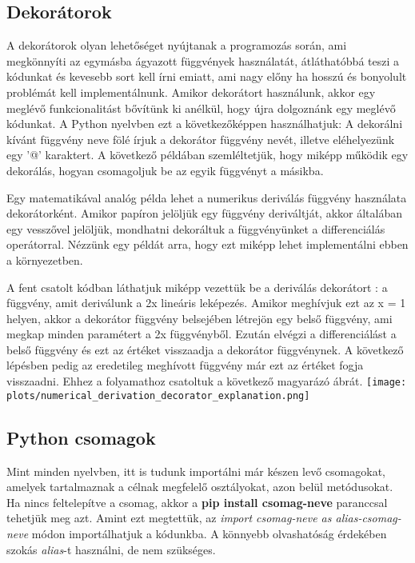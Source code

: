 \documentclass{article}
\theoremstyle{definition}
\theoremstyle{theorem}
\begin{document}
\subsection{Dekorátorok}
A dekorátorok olyan lehetőséget nyújtanak a programozás során, ami megkönnyíti az egymásba ágyazott függvények használatát, átláthatóbbá teszi a kódunkat és kevesebb sort kell írni emiatt, ami nagy előny ha hosszú és bonyolult problémát kell implementálnunk. Amikor dekorátort használunk, akkor egy meglévő funkcionalitást bővítünk ki anélkül, hogy újra dolgoznánk egy meglévő kódunkat. A Python nyelvben ezt a következőképpen használhatjuk: A dekorálni kívánt függvény neve fölé írjuk a dekorátor függvény nevét, illetve eléhelyezünk egy '@' karaktert. A következő példában szemléltetjük, hogy miképp működik egy dekorálás, hogyan csomagoljuk be az egyik függvényt a másikba.

\pagebreak
Egy matematikával analóg példa lehet a numerikus deriválás függvény használata dekorátorként. Amikor papíron jelöljük egy függvény deriváltját, akkor általában egy vesszővel jelöljük, mondhatni dekoráltuk a függvényünket a differenciálás operátorral. Nézzünk egy példát arra, hogy ezt miképp lehet implementálni ebben a környezetben.

A fent csatolt kódban láthatjuk miképp vezettük be a deriválás dekorátort : a függvény, amit deriválunk a 2x lineáris leképezés. Amikor meghívjuk ezt az x = 1 helyen, akkor a dekorátor függvény belsejében létrejön egy belső függvény, ami megkap minden paramétert a 2x függvényből. Ezután elvégzi a differenciálást a belső függvény és ezt az értéket visszaadja a dekorátor függvénynek. A következő lépésben pedig az eredetileg meghívott függvény már ezt az értéket fogja visszaadni. Ehhez a folyamathoz csatoltuk a következő magyarázó ábrát. \newline
\texttt{[image: plots/numerical\_derivation\_decorator\_explanation.png]}
\subsection{Python csomagok}
Mint minden nyelvben, itt is tudunk importálni már készen levő csomagokat, amelyek tartalmaznak a célnak megfelelő osztályokat, azon belül metódusokat. Ha nincs feltelepítve a csomag, akkor a \textbf{pip install csomag-neve} paranccsal tehetjük meg azt.
Amint ezt megtettük, az \textit{import csomag-neve as alias-csomag-neve} módon importálhatjuk a kódunkba. A könnyebb olvashatóság érdekében szokás \textit{alias}-t használni, de nem szükséges.
\end{document}
